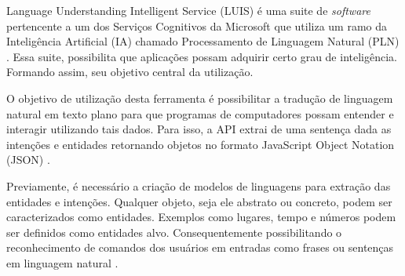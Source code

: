 Language Understanding Intelligent Service (LUIS) é uma suite de \textit{software} pertencente a um dos Serviços Cognitivos da Microsoft que utiliza um ramo da Inteligência Artificial (IA) chamado Processamento de Linguagem Natural (PLN) \cite{Mayo:2017}. Essa suite, possibilita que aplicações possam adquirir certo grau de inteligência. Formando assim, seu objetivo central da utilização.

O objetivo de utilização desta ferramenta é possibilitar a tradução de linguagem natural em texto plano para que programas de computadores possam entender e interagir utilizando tais dados. Para isso, a API extrai de uma sentença dada as intenções e entidades retornando objetos no formato JavaScript Object Notation (JSON) \cite{Mayo:2017}.

Previamente, é necessário a criação de modelos de linguagens para extração das entidades e intenções. Qualquer objeto, seja ele abstrato ou concreto, podem ser caracterizados como entidades. Exemplos como lugares, tempo e números podem ser definidos como entidades alvo. Consequentemente possibilitando o reconhecimento de comandos dos usuários em entradas como frases ou sentenças em linguagem natural \cite{Larsen:2017}.
